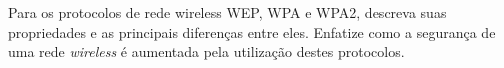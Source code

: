
\exercise Para os protocolos de rede wireless WEP, WPA e WPA2,
descreva suas propriedades e as principais diferenças entre eles.
Enfatize como a segurança de uma rede {\em wireless} é aumentada pela
utilização destes protocolos. \par